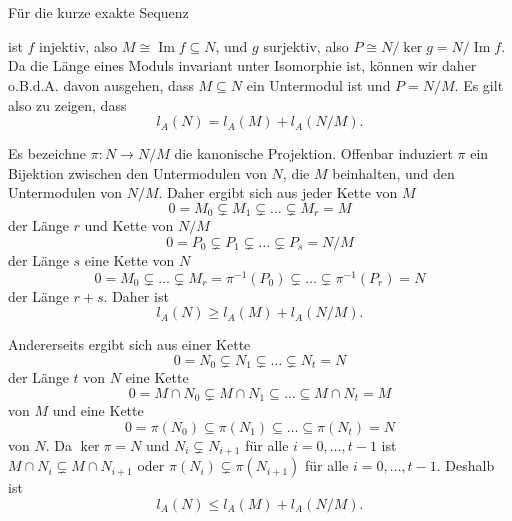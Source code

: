 \documentclass[a4paper,10pt]{article}
\theoremstyle{definition}
\newcommand{\Img}{\operatorname{Im}}
\begin{document}
\section{}
Für die kurze exakte Sequenz
\begin{center}
\end{center}
ist $f$ injektiv, also $M \cong \Img f \subseteq N$, und $g$ surjektiv, also $P \cong N / \ker g = N / \Img f$. Da die Länge eines Moduls invariant unter Isomorphie ist, können wir daher o.B.d.A. davon ausgehen, dass $M \subseteq N$ ein Untermodul ist und $P = N/M$. Es gilt also zu zeigen, dass
\[
 l_A(N) = l_A(M) + l_A(N/M).
\]

Es bezeichne $\pi : N \rightarrow N/M$ die kanonische Projektion. Offenbar induziert $\pi$ ein Bijektion zwischen den Untermodulen von $N$, die $M$ beinhalten, und den Untermodulen von $N/M$. Daher ergibt sich aus jeder Kette von $M$
\[
 0 = M_0 \subsetneq M_1 \subsetneq \ldots \subsetneq M_r = M
\]
der Länge $r$ und Kette von $N/M$
\[
 0 = P_0 \subsetneq P_1 \subsetneq \ldots \subsetneq P_s = N/M
\]
der Länge $s$ eine Kette von $N$
\[
 0 = M_0 \subsetneq \ldots \subsetneq M_r = \pi^{-1}(P_0) \subsetneq \ldots \subsetneq \pi^{-1}(P_r) = N
\]
der Länge $r+s$. Daher ist
\[
 l_A(N) \geq l_A(M) + l_A(N/M).
\]

Andererseits ergibt sich aus einer Kette
\[
 0 = N_0 \subsetneq N_1 \subsetneq \ldots \subsetneq N_t = N
\]
der Länge $t$ von $N$ eine Kette
\[
 0 = M \cap N_0 \subsetneq M \cap N_1 \subseteq \ldots \subseteq M \cap N_t = M
\]
von $M$ und eine Kette
\[
 0 = \pi(N_0) \subseteq \pi(N_1) \subseteq \ldots \subseteq \pi(N_t) = N
\]
von $N$. Da $\ker \pi = N$ und $N_i \subsetneq N_{i+1}$ für alle $i=0, \ldots, t-1$ ist $M \cap N_i \subsetneq M \cap N_{i+1}$ oder $\pi(N_i) \subsetneq \pi(N_{i+1})$ für alle $i=0, \ldots, t-1$. Deshalb ist
\[
 l_A(N) \leq l_A(M) + l_A(N/M).
\]





\section{}
\end{document}
